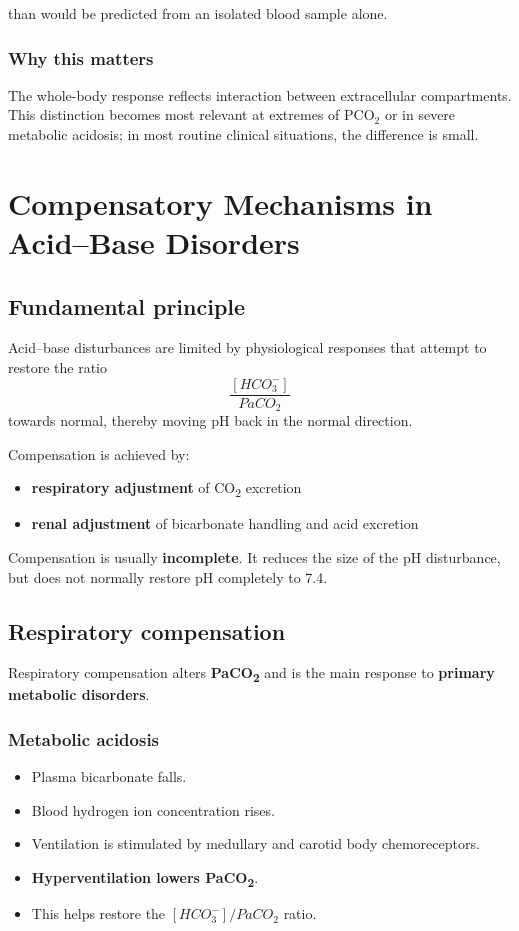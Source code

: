 \documentclass[11pt,a4paper]{article}
\begin{document}
than would be predicted from an isolated blood sample alone.

\subsubsection{Why this matters}

The whole-body response reflects interaction between extracellular compartments. This distinction becomes most relevant at extremes of \( \mathrm{PCO_2} \) or in severe metabolic acidosis; in most routine clinical situations, the difference is small.

\section{Compensatory Mechanisms in Acid--Base Disorders}

\subsection{Fundamental principle}

Acid--base disturbances are limited by physiological responses that attempt to restore the ratio
\[
\frac{[HCO_3^-]}{PaCO_2}
\]
towards normal, thereby moving pH back in the normal direction.

Compensation is achieved by:
\begin{itemize}
  \item \textbf{respiratory adjustment} of CO\textsubscript{2} excretion
  \item \textbf{renal adjustment} of bicarbonate handling and acid excretion
\end{itemize}

Compensation is usually \textbf{incomplete}. It reduces the size of the pH disturbance, but does not normally restore pH completely to 7.4.

\subsection{Respiratory compensation}

Respiratory compensation alters \textbf{PaCO\textsubscript{2}} and is the main response to \textbf{primary metabolic disorders}.

\subsubsection{Metabolic acidosis}

\begin{itemize}
  \item Plasma bicarbonate falls.
  \item Blood hydrogen ion concentration rises.
  \item Ventilation is stimulated by medullary and carotid body chemoreceptors.
  \item \textbf{Hyperventilation lowers PaCO\textsubscript{2}}.
  \item This helps restore the \([HCO_3^-]/PaCO_2\) ratio.
\end{itemize}
\end{document}
